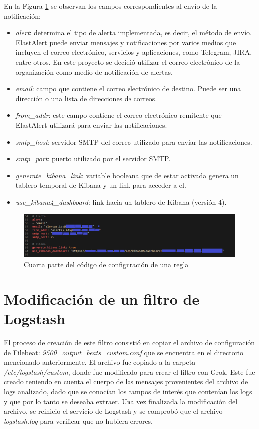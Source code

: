     \FloatBarrier
    En la Figura \ref{fig:iter2_4_codigo} se observan los campos correspondientes al envío de la notificación:
    \begin{itemize}
        \item \textit{alert}: determina el tipo de alerta implementada, es decir, el método de envío. ElastAlert puede enviar mensajes y notificaciones por varios medios que incluyen el correo electrónico, servicios y aplicaciones, como Telegram, JIRA, entre otros. En este proyecto se decidió utilizar el correo electrónico de la organización como medio de notificación de alertas.
        \item \textit{email}: campo que contiene el correo electrónico de destino. Puede ser una dirección o una lista de direcciones de correos.
        \item \textit{from\_addr}: este campo contiene el correo electrónico remitente que ElastAlert utilizará para enviar las notificaciones.
        \item \textit{smtp\_host}: servidor SMTP del correo utilizado para enviar las notificaciones.
        \item \textit{smtp\_port}: puerto utilizado por el servidor SMTP.
        \item \textit{generate\_kibana\_link}: variable booleana que de estar activada genera un tablero temporal de Kibana y un link para acceder a el.
        \item \textit{use\_kibana4\_dashboard}: link hacia un tablero de Kibana (versión 4).
    \end{itemize}
    \begin{figure}[H]
    \centering
        \includegraphics[width=1\textwidth]{./iteracion_2_imagenes/6-codigoAlerta4.png}
        \caption{Cuarta parte del código de configuración de una regla}
        \label{fig:iter2_4_codigo}
    \end{figure}
    \FloatBarrier
    
\chapter{Modificación de un filtro de Logstash}
El proceso de creación de este filtro consistió en copiar el archivo de configuración de Filebeat: \textit{9500\_output\_beats\_custom.conf} que se encuentra en el directorio mencionado anteriormente. El archivo fue copiado a la carpeta \textit{/etc/logstash/custom}, donde fue modificado para crear el filtro con Grok. Este fue creado teniendo en cuenta el cuerpo de los mensajes provenientes del archivo de logs analizado, dado que se conocían los campos de interés que contenían los logs y que por lo tanto se deseaba extraer. Una vez finalizada la modificación del archivo, se reinicio el servicio de Logstash y se comprobó que el archivo \textit{logstash.log} para verificar que no hubiera errores.\par
